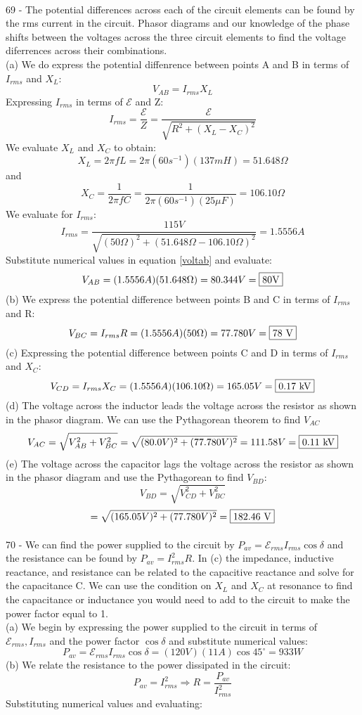 \documentclass{report}
\begin{document}
\paragraph{}
69 - The potential differences across each of the circuit elements can be found by the rms current in the circuit. Phasor diagrams and our knowledge of the phase shifts between the voltages across the three circuit elements to find the voltage diferrences across their combinations.\\
(a) We do express the potential diffenrence between points A and B in terms of $I_{rms}$ and $X_L$:
\begin{equation}\label{voltab}
  V_{AB} = I_{rms}X_L
\end{equation}
Expressing $I_{rms}$ in terms of $\mathcal{E}$ and Z:
$$I_{rms} = \frac{\mathcal{E}}{Z} = \frac{\mathcal{E}}{\sqrt{R^2 + (X_L - X_C)^2}}$$
We evaluate $X_L$ and $X_C$ to obtain:
$$X_L = 2 \pi fL = 2 \pi (60s^{-1})(137 mH) = 51.648 \Omega$$
and
$$X_C = \frac{1}{2 \pi fC} = \frac{1}{2 \pi (60s^{-1})(25 \mu F)} = 106.10 \Omega$$
We evaluate for $I_{rms}$:
$$I_{rms} = \frac{115 V}{\sqrt{(50 \Omega)^2 + (51.648 \Omega - 106.10 \Omega)^2}} = 1.5556 A$$
Substitute numerical values in equation \ref{voltab} and evaluate:
$$V_{AB} = (1.5556 A)(51.648 \Omega) = 80.344 V = \fbox{80V}$$
(b) We express the potential difference between points B and C in terms of $I_{rms}$ and R:
$$V_{BC} = I_{rms}R = (1.5556 A)(50 \Omega) = 77.780 V = \fbox{78 V}$$
(c) Expressing the potential difference between points C and D in terms of $I_{rms}$ and $X_C$:
$$V_{CD} = I_{rms}X_C = (1.5556 A)(106.10 \Omega) = 165.05 V = \fbox{0.17 kV}$$
(d) The voltage across the inductor leads the voltage across the resistor as shown in the phasor diagram. We can use the Pythagorean theorem to find $V_{AC}$
$$V_{AC} = \sqrt{V_{AB}^2 + V_{BC}^2} = \sqrt{(80.0 V)^2 + (77.780 V)^2} = 111.58 V = \fbox{0.11 kV}$$
(e) The voltage across the capacitor lags the voltage across the resistor as shown in the phasor diagram and use the Pythagorean to find $V_{BD}$:
$$V_{BD} = \sqrt{V_{CD}^2 + V_{BC}^2}$$
$$= \sqrt{(165.05 V)^2 + (77.780 V)^2} = \fbox{182.46 V}$$

\paragraph{}
70 - We can find the power supplied to the circuit by $P_{av} = \mathcal{E}_{rms}I_{rms}\cos \delta$ and the resistance can be found by $P_{av} = I_{rms}^2R$. In (c) the impedance, inductive reactance, and resistance can be related to the capacitive reactance and solve for the capacitance C. We can use the condition on $X_L$ and $X_C$ at resonance to find the capacitance or inductance you would need to add to the circuit to make the power factor equal to 1.\\
(a) We begin by expressing the power supplied to the circuit in terms of $\mathcal{E}_{rms}, I_{rms}$ and the power factor $\cos \delta$ and substitute numerical values:
$$P_{av} = \mathcal{E}_{rms}I_{rms} \cos \delta = (120 V)(11 A) \cos 45^{\circ} = 933 W$$
(b) We relate the resistance to the power dissipated in the circuit:
$$P_{av} = I_{rms}^2 \Rightarrow R = \frac{P_{av}}{I_{rms}^2}$$
Substituting numerical values and evaluating:
\end{document}
